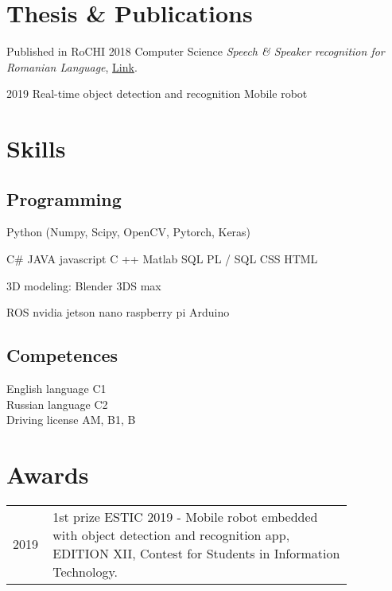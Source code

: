 \documentclass[]{deedy-resume-openfont}
\begin{document}
\begin{minipage}[t]{0.59\textwidth}
\section{Thesis \& Publications} 
\renewcommand\refname{\vskip -1.5cm} 


\textbullet{} Published in RoCHI 2018 \textbullet{} Computer Science  \textbullet{} \textit{Speech \& Speaker recognition for Romanian Language}, 
\href{https://www.semanticscholar.org/paper/Speech-%26-Speaker-recognition-for-Romanian-Language-Vezeteu-Sburlan/ef8aa0bd5d8109c5173a0b57fbba95243c704d3e}{Link}.
\sectionsep

\textbullet{} 2019 \textbullet{} Real-time object detection and recognition \textbullet{} Mobile robot


\section{Skills}
\subsection{Programming}
Python (Numpy, Scipy, OpenCV, Pytorch, Keras)

\sectionsep
{}
C\# \textbullet{} JAVA \textbullet{} javascript \textbullet{}
C ++ \textbullet{} Matlab \textbullet{} SQL \textbullet{} PL / SQL \textbullet{} CSS \textbullet{} HTML

\sectionsep
{}
3D modeling: \textbullet{}Blender \textbullet{}3DS max

\sectionsep
{}
\textbullet{} ROS \textbullet{} nvidia jetson nano \textbullet{}raspberry pi \textbullet{}Arduino

\sectionsep
\subsection{Competences}
\textbullet{} English language C1\\
\textbullet{} Russian language C2 \\
\textbullet{} Driving license AM, B1, B

\sectionsep


\section{Awards} 
\begin{tabular}{p{0.05\linewidth}p{0.8\linewidth}}
2019  &  1st prize ESTIC 2019 - Mobile robot embedded with object detection and recognition app, EDITION  XII, Contest for Students in Information Technology. \\


\end{tabular}
\end{minipage}
\end{document}
